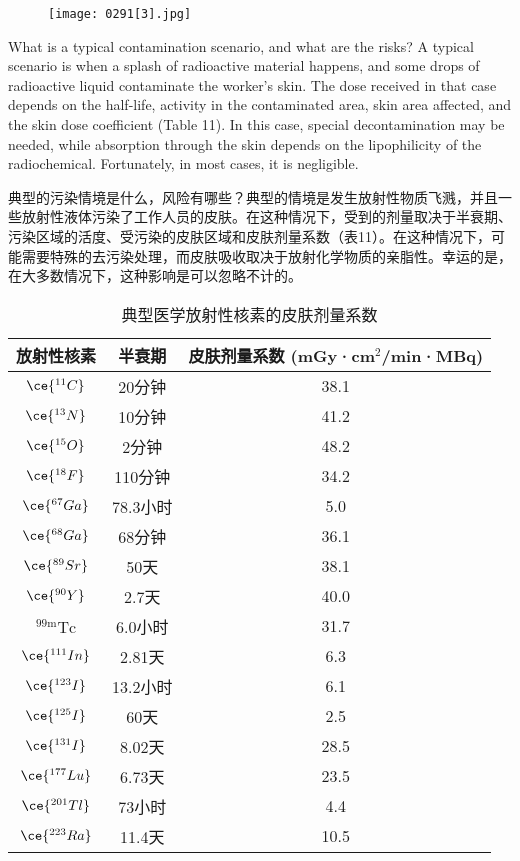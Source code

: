 \documentclass[dvipsnames, svgnames,a4paper,11pt]{article}
\begin{document}
\begin{figure}[h]
    \centering
    \texttt{[image: 0291[3].jpg]}
     \label{fig385}
\end{figure}

What is a typical contamination scenario, and what are the risks? A typical scenario is when a splash of radioactive material happens, and some drops of radioactive liquid contaminate the worker's skin. The dose received in that case depends on the half-life, activity in the contaminated area, skin area affected, and the skin dose coefficient (Table 11). In this case, special decontamination may be needed, while absorption through the skin depends on the lipophilicity of the radiochemical. Fortunately, in most cases, it is negligible.

典型的污染情境是什么，风险有哪些？典型的情境是发生放射性物质飞溅，并且一些放射性液体污染了工作人员的皮肤。在这种情况下，受到的剂量取决于半衰期、污染区域的活度、受污染的皮肤区域和皮肤剂量系数（表11）。在这种情况下，可能需要特殊的去污染处理，而皮肤吸收取决于放射化学物质的亲脂性。幸运的是，在大多数情况下，这种影响是可以忽略不计的。

\begin{table}[h!]
\centering
\begin{tabular}{ccc}
\hline
\textbf{放射性核素} & \textbf{半衰期} & \textbf{皮肤剂量系数 (mGy·cm\(^2\)/min·MBq)} \\
\hline
\(\ce{^{11}C}\) & 20分钟 & 38.1 \\
\(\ce{^{13}N}\) & 10分钟 & 41.2 \\
\(\ce{^{15}O}\) & 2分钟 & 48.2 \\
\(\ce{^{18}F}\) & 110分钟 & 34.2 \\
\(\ce{^{67}Ga}\) & 78.3小时 & 5.0 \\
\(\ce{^{68}Ga}\) & 68分钟 & 36.1 \\
\(\ce{^{89}Sr}\) & 50天 & 38.1 \\
\(\ce{^{90}Y}\) & 2.7天 & 40.0 \\
\(\mathrm{^{99m}Tc}\) & 6.0小时 & 31.7 \\
\(\ce{^{111}In}\) & 2.81天 & 6.3 \\
\(\ce{^{123}I}\) & 13.2小时 & 6.1 \\
\(\ce{^{125}I}\) & 60天 & 2.5 \\
\(\ce{^{131}I}\) & 8.02天 & 28.5 \\
\(\ce{^{177}Lu}\) & 6.73天 & 23.5 \\
\(\ce{^{201}Tl}\) & 73小时 & 4.4 \\
\(\ce{^{223}Ra}\) & 11.4天 & 10.5 \\
\hline
\end{tabular}
\caption{典型医学放射性核素的皮肤剂量系数}
\end{table}
\end{document}
